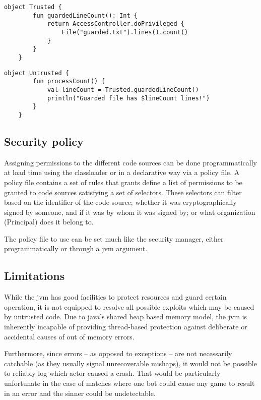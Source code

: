 \documentclass[11pt,a4paper,oneside]{report}
\newcommand{\code}{\texttt}
\begin{document}
	\begin{center}
		\begin{minipage}{11cm}
		\begin{lstlisting}[title={\code{Trusted.kt}}]
	object Trusted {
		fun guardedLineCount(): Int {
			return AccessController.doPrivileged {
				File("guarded.txt").lines().count()
			}
		}
	}
		\end{lstlisting}
	
		\begin{lstlisting}[title={\code{Untrusted.kt}}]
	object Untrusted {
		fun processCount() {
			val lineCount = Trusted.guardedLineCount()
			println("Guarded file has $lineCount lines!")
		}
	}
		\end{lstlisting}
		\end{minipage}
	\end{center}

	\subsection{Security policy}
	
	Assigning permissions to the different code sources can be done programmatically at load time using the classloader or in a declarative way via a policy file. A policy file contains a set of rules that grants define a list of permissions to be granted to code sources satisfying a set of selectors. These selectors can filter based on the identifier of the code source; whether it was cryptographically signed by someone, and if it was by whom it was signed by; or what organization (Principal) does it belong to.
	
	The policy file to use can be set much like the security manager, either programmatically or through a jvm argument. 

	\subsection{Limitations}
	
	While the jvm has good facilities to protect resources and guard certain operation, it is not equipped to resolve all possible exploits which may be caused by untrusted code. Due to java's shared heap based memory model, the jvm is inherently incapable of providing thread-based protection against deliberate or accidental causes of out of memory errors.
	
	Furthermore, since errors -- as opposed to exceptions -- are not necessarily catchable (as they usually signal unrecoverable mishaps), it would not be possible to reliably log which actor caused a crash. That would be particularly unfortunate in the case of matches where one bot could cause any game to result in an error and the sinner could be undetectable.  
\end{document}
